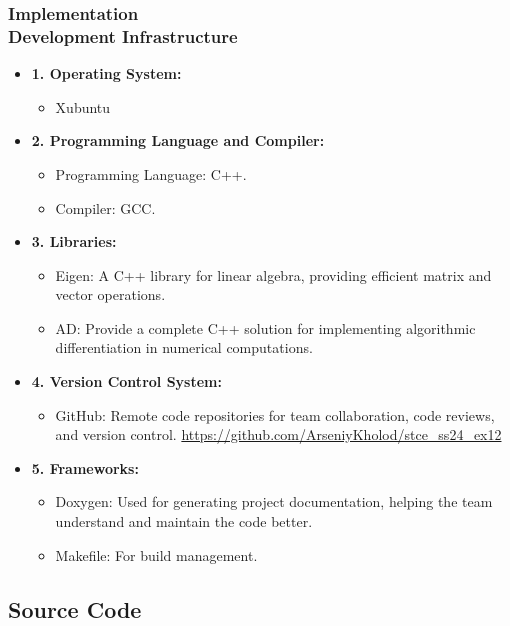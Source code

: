 \documentclass[ucs,10pt]{beamer}
\begin{document}
\begin{frame}
\frametitle{Implementation \\
	\small \color{rwth-blue} Development Infrastructure}
	\begin{itemize}	
		\item \textbf{1. Operating System:}
			\begin{itemize}
				\item Xubuntu
			\end{itemize}
		\item \textbf{2. Programming Language and Compiler:}
			\begin{itemize}
				\item Programming Language: C++.
				\item Compiler: GCC.
			\end{itemize}
		\item \textbf{3. Libraries:}
			\begin{itemize}
				\item Eigen: A C++ library for linear algebra, providing efficient matrix and vector operations.
				\item AD: Provide a complete C++ solution for implementing algorithmic differentiation in numerical computations.
			\end{itemize}
		\item \textbf{4. Version Control System:}
			\begin{itemize}
				\item GitHub: Remote code repositories for team collaboration, code reviews, and version control. \url{https://github.com/ArseniyKholod/stce_ss24_ex12}
			\end{itemize}
		\item \textbf{5. Frameworks:}
			\begin{itemize}
				\item Doxygen: Used for generating project documentation, helping the team understand and maintain the code better.
				\item Makefile: For build management.
			\end{itemize}
	\end{itemize}
\end{frame}



\subsection{Source Code}
\end{document}
